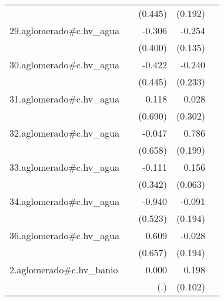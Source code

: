 {\begin{longtable}{l*{4}{D{.}{.}{-1}}}
            &                     &     (0.445)         &     (0.192)         &                     \\
\addlinespace
29.aglomerado#c.hv\_agua&                     &      -0.306         &      -0.254         &                     \\
            &                     &     (0.400)         &     (0.135)         &                     \\
\addlinespace
30.aglomerado#c.hv\_agua&                     &      -0.422         &      -0.240         &                     \\
            &                     &     (0.445)         &     (0.233)         &                     \\
\addlinespace
31.aglomerado#c.hv\_agua&                     &       0.118         &       0.028         &                     \\
            &                     &     (0.690)         &     (0.302)         &                     \\
\addlinespace
32.aglomerado#c.hv\_agua&                     &      -0.047         &       0.786\sym{***}&                     \\
            &                     &     (0.658)         &     (0.199)         &                     \\
\addlinespace
33.aglomerado#c.hv\_agua&                     &      -0.111         &       0.156\sym{*}  &                     \\
            &                     &     (0.342)         &     (0.063)         &                     \\
\addlinespace
34.aglomerado#c.hv\_agua&                     &      -0.940         &      -0.091         &                     \\
            &                     &     (0.523)         &     (0.194)         &                     \\
\addlinespace
36.aglomerado#c.hv\_agua&                     &       0.609         &      -0.028         &                     \\
            &                     &     (0.657)         &     (0.194)         &                     \\
\addlinespace
2.aglomerado#c.hv\_banio&                     &       0.000         &       0.198         &                     \\
            &                     &         (.)         &     (0.102)         &                     \\

\end{longtable}}
